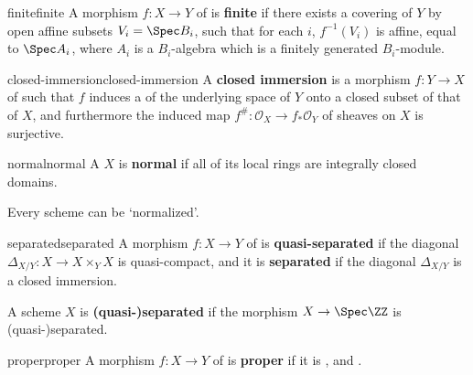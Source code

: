 \begin{topic}{finite}{finite}
    A morphism $f : X \to Y$ of  is \textbf{finite} if there exists a covering of $Y$ by open affine subsets $V_i = \Spec B_i$, such that for each $i$, $f^{-1}(V_i)$ is affine, equal to $\Spec A_i$, where $A_i$ is a $B_i$-algebra which is a finitely generated $B_i$-module.
\end{topic}

\begin{topic}{closed-immersion}{closed-immersion}
    A \textbf{closed immersion} is a morphism $f : Y \to X$ of  such that $f$ induces a  of the underlying space of $Y$ onto a closed subset of that of $X$, and furthermore the induced map $f^\# : \mathcal{O}_X \to f_*\mathcal{O}_Y$ of sheaves on $X$ is surjective.
\end{topic}

\begin{topic}{normal}{normal}
    A  $X$ is \textbf{normal} if all of its local rings are integrally closed domains.
    
    Every scheme can be `normalized'.
\end{topic}

\begin{topic}{separated}{separated}
    A morphism $f : X \to Y$ of  is \textbf{quasi-separated} if the diagonal $\Delta_{X/Y} : X \to X \times_Y X$ is quasi-compact, and it is \textbf{separated} if the diagonal $\Delta_{X/Y}$ is a closed immersion.
    
    A scheme $X$ is \textbf{(quasi-)separated} if the morphism $X \to \Spec \ZZ$ is (quasi-)separated.
\end{topic}

\begin{topic}{proper}{proper}
    A morphism $f : X \to Y$ of  is \textbf{proper} if it is ,  and .
\end{topic}
